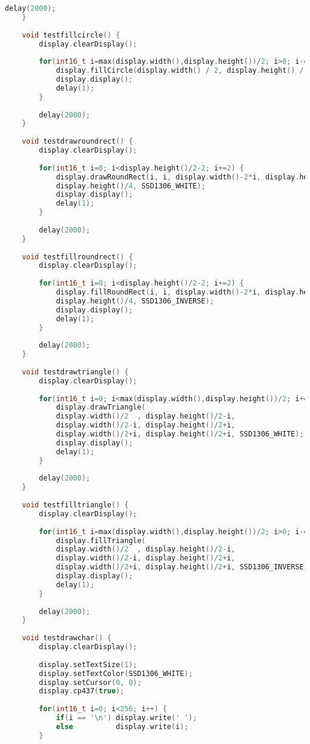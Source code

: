 \begin{code}
\begin{lstlisting}[language=c++]
		delay(2000);
	}
	
	void testfillcircle() {
		display.clearDisplay();
		
		for(int16_t i=max(display.width(),display.height())/2; i>0; i-=3) {
			display.fillCircle(display.width() / 2, display.height() / 2, i, SSD1306_INVERSE);
			display.display();
			delay(1);
		}
		
		delay(2000);
	}
	
	void testdrawroundrect() {
		display.clearDisplay();
		
		for(int16_t i=0; i<display.height()/2-2; i+=2) {
			display.drawRoundRect(i, i, display.width()-2*i, display.height()-2*i,
			display.height()/4, SSD1306_WHITE);
			display.display();
			delay(1);
		}
		
		delay(2000);
	}
	
	void testfillroundrect() {
		display.clearDisplay();
		
		for(int16_t i=0; i<display.height()/2-2; i+=2) {
			display.fillRoundRect(i, i, display.width()-2*i, display.height()-2*i,
			display.height()/4, SSD1306_INVERSE);
			display.display();
			delay(1);
		}
		
		delay(2000);
	}
	
	void testdrawtriangle() {
		display.clearDisplay();
		
		for(int16_t i=0; i<max(display.width(),display.height())/2; i+=5) {
			display.drawTriangle(
			display.width()/2  , display.height()/2-i,
			display.width()/2-i, display.height()/2+i,
			display.width()/2+i, display.height()/2+i, SSD1306_WHITE);
			display.display();
			delay(1);
		}
		
		delay(2000);
	}
	
	void testfilltriangle() {
		display.clearDisplay();
		
		for(int16_t i=max(display.width(),display.height())/2; i>0; i-=5) {
			display.fillTriangle(
			display.width()/2  , display.height()/2-i,
			display.width()/2-i, display.height()/2+i,
			display.width()/2+i, display.height()/2+i, SSD1306_INVERSE);
			display.display();
			delay(1);
		}
		
		delay(2000);
	}
	
	void testdrawchar() {
		display.clearDisplay();
		
		display.setTextSize(1);
		display.setTextColor(SSD1306_WHITE);
		display.setCursor(0, 0);
		display.cp437(true);
		
		for(int16_t i=0; i<256; i++) {
			if(i == '\n') display.write(' ');
			else          display.write(i);
		}
		

\end{lstlisting}
\end{code}
